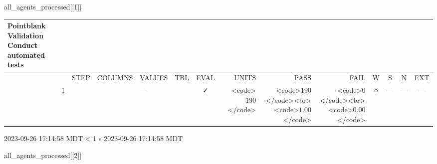 \documentclass[
  letterpaper,
  DIV=11,
  numbers=noendperiod]{scrreprt}
\newenvironment{Shaded}{\begin{snugshade}}{\end{snugshade}}
\newcommand{\DecValTok}[1]{\textcolor[rgb]{0.68,0.00,0.00}{#1}}
\newcommand{\NormalTok}[1]{\textcolor[rgb]{0.00,0.23,0.31}{#1}}
\begin{document}
\begin{Shaded}
\begin{Highlighting}[]
\NormalTok{all\_agents\_processed[[}\DecValTok{1}\NormalTok{]]}
\end{Highlighting}
\end{Shaded}

\setlength{\LTpost}{0mm}
\begin{longtable}{lrlllccrrrcccc}
\caption*{
{\large Pointblank Validation} \\ 
{\small Conduct automated tests}
} \\ 
\toprule
 &  & STEP & COLUMNS & VALUES & TBL & EVAL & UNITS & PASS & FAIL & W & S & N & EXT \\ 
\midrule
 & 1 &  &  & — &                                                              & ✓ & <code>$190$</code> & <code>$190$</code><br><code>$1.00$</code> & <code>$0$</code><br><code>$0.00$</code> & ○ & --- & --- & --- \\ 
\bottomrule
\end{longtable}
\begin{minipage}{\linewidth}
2023-09-26 17:14:58 MDT
\textless{} 1 s
2023-09-26 17:14:58 MDT\\
\end{minipage}

\begin{Shaded}
\begin{Highlighting}[]
\NormalTok{all\_agents\_processed[[}\DecValTok{2}\NormalTok{]]}
\end{Highlighting}
\end{Shaded}
\end{document}
